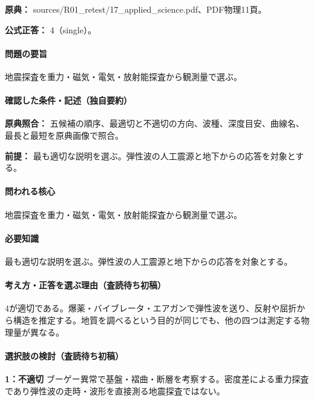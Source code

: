 \noindent\textbf{原典：} sources/R01\_retest/17\_applied\_science.pdf、PDF物理11頁。

\textbf{公式正答：} 4（single）。

\paragraph{問題の要旨} 地震探査を重力・磁気・電気・放射能探査から観測量で選ぶ。

\paragraph{確認した条件・記述（独自要約）}\mbox{}\par

\noindent\textbf{原典照合：} 五候補の順序、最適切と不適切の方向、波種、深度目安、曲線名、最長と最短を原典画像で照合。\par

\noindent\textbf{前提：} 最も適切な説明を選ぶ。弾性波の人工震源と地下からの応答を対象とする。\par

\paragraph{問われる核心} 地震探査を重力・磁気・電気・放射能探査から観測量で選ぶ。

\paragraph{必要知識} 最も適切な説明を選ぶ。弾性波の人工震源と地下からの応答を対象とする。

\paragraph{考え方・正答を選ぶ理由（査読待ち初稿）} 4が適切である。爆薬・バイブレータ・エアガンで弾性波を送り、反射や屈折から構造を推定する。地質を調べるという目的が同じでも、他の四つは測定する物理量が異なる。

\paragraph{選択肢の検討（査読待ち初稿）}\mbox{}\par

\noindent\textbf{1：不適切} ブーゲー異常で基盤・褶曲・断層を考察する。密度差による重力探査であり弾性波の走時・波形を直接測る地震探査ではない。\par

